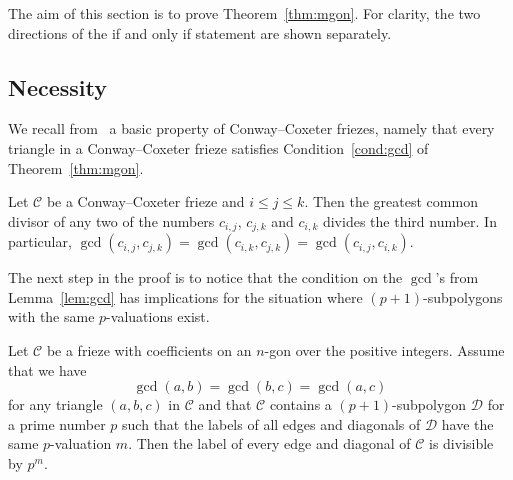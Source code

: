 \documentclass[ALCO,ThmDefs,Unicode,epreuves,published]{cedram}
\numberwithin{equation}{section}
\begin{document}
The aim of this section is to prove Theorem~\ref{thm:mgon}.
For clarity, the two directions of the if and only if statement are shown separately.

\subsection{Necessity}
\label{sec:necessary}

We recall from~\cite{CHJ} a basic property of Conway--Coxeter friezes, namely that every triangle in a Conway--Coxeter frieze satisfies Condition~\eqref{cond:gcd} of Theorem~\ref{thm:mgon}.

\begin{lemm} \label{lem:gcd}
Let $\mathcal{C}$ be a Conway--Coxeter frieze and $i\le j\le k$. 
Then the greatest common divisor of any two of the numbers $c_{i,j}$,
$c_{j,k}$ and $c_{i,k}$ divides the third number. In particular,
$\gcd(c_{i,j},c_{j,k})=\gcd(c_{i,k},c_{j,k})=\gcd(c_{i,j},c_{i,k})$.
\end{lemm}

The next step in the proof is to notice that the condition on the $\gcd$'s 
from Lemma~\ref{lem:gcd} has implications for the situation where 
$(p+1)$-subpolygons with the same $p$-valuations exist.

\begin{prop}\label{prop:pm}
Let $\mathcal{C}$ be a frieze with coefficients on an $n$-gon over the positive integers.
Assume that we have
\begin{equation}\label{cgcd}
\gcd(a,b)=\gcd(b,c)=\gcd(a,c)
\end{equation}
for any triangle $(a,b,c)$ in $\mathcal{C}$
and that $\mathcal{C}$ contains a $(p+1)$-subpolygon $\mathcal{D}$ for a prime number $p$
such that the labels of all edges and diagonals of $\mathcal{D}$ have the 
same $p$-valuation $m$.
Then the label of every edge and diagonal of $\mathcal{C}$ is divisible by $p^m$.
\end{prop}
\end{document}
